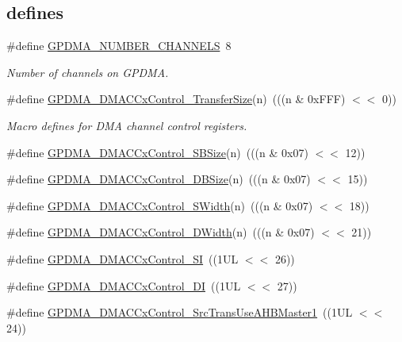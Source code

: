 \subsection*{\textquotesingle{}defines\textquotesingle{}}
\begin{DoxyCompactItemize}
\item 
\#define \hyperlink{group___g_p_d_m_a__18_x_x__43_x_x_gaf7c43b3d13c91c30ddf67e479966d5cd}{G\+P\+D\+M\+A\+\_\+\+N\+U\+M\+B\+E\+R\+\_\+\+C\+H\+A\+N\+N\+E\+LS}~8
\begin{DoxyCompactList}\small\item\em Number of channels on G\+P\+D\+MA. \end{DoxyCompactList}\item 
\#define \hyperlink{group___g_p_d_m_a__18_x_x__43_x_x_ga0e3ee35f724f4ef0cc8e91dfaec761e4}{G\+P\+D\+M\+A\+\_\+\+D\+M\+A\+C\+Cx\+Control\+\_\+\+Transfer\+Size}(n)~(((n \& 0x\+F\+F\+F) $<$$<$ 0))
\begin{DoxyCompactList}\small\item\em Macro defines for D\+MA channel control registers. \end{DoxyCompactList}\item 
\#define \hyperlink{group___g_p_d_m_a__18_x_x__43_x_x_ga1f5c9d534965c6a89ea22ca3fa48d859}{G\+P\+D\+M\+A\+\_\+\+D\+M\+A\+C\+Cx\+Control\+\_\+\+S\+B\+Size}(n)~(((n \& 0x07) $<$$<$ 12))
\item 
\#define \hyperlink{group___g_p_d_m_a__18_x_x__43_x_x_ga18c40b7931f0b6cfe8b81f9a982c0641}{G\+P\+D\+M\+A\+\_\+\+D\+M\+A\+C\+Cx\+Control\+\_\+\+D\+B\+Size}(n)~(((n \& 0x07) $<$$<$ 15))
\item 
\#define \hyperlink{group___g_p_d_m_a__18_x_x__43_x_x_ga2ee63289c5e248a07ea901e233e1dd00}{G\+P\+D\+M\+A\+\_\+\+D\+M\+A\+C\+Cx\+Control\+\_\+\+S\+Width}(n)~(((n \& 0x07) $<$$<$ 18))
\item 
\#define \hyperlink{group___g_p_d_m_a__18_x_x__43_x_x_ga67bb6ed286afe6d4091c0fcd8799b451}{G\+P\+D\+M\+A\+\_\+\+D\+M\+A\+C\+Cx\+Control\+\_\+\+D\+Width}(n)~(((n \& 0x07) $<$$<$ 21))
\item 
\#define \hyperlink{group___g_p_d_m_a__18_x_x__43_x_x_gaa9b006e86536835dfe6f7034ee25d12a}{G\+P\+D\+M\+A\+\_\+\+D\+M\+A\+C\+Cx\+Control\+\_\+\+SI}~((1\+U\+L $<$$<$ 26))
\item 
\#define \hyperlink{group___g_p_d_m_a__18_x_x__43_x_x_gaddcec41c911bbd0911391e6195c1c040}{G\+P\+D\+M\+A\+\_\+\+D\+M\+A\+C\+Cx\+Control\+\_\+\+DI}~((1\+U\+L $<$$<$ 27))
\item 
\#define \hyperlink{group___g_p_d_m_a__18_x_x__43_x_x_ga90b29a1b2c82b32d6e586d74cdd727b7}{G\+P\+D\+M\+A\+\_\+\+D\+M\+A\+C\+Cx\+Control\+\_\+\+Src\+Trans\+Use\+A\+H\+B\+Master1}~((1\+U\+L $<$$<$ 24))

\end{DoxyCompactItemize}
